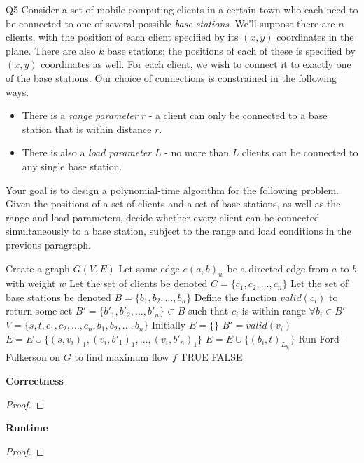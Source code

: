 \begin{problem}
  {Q5}
  Consider a set of mobile computing clients in a certain town who each need to be connected to one of several possible \textit{base stations}.
  We'll suppose there are $n$ clients, with the position of each client specified by its $(x,y)$ coordinates in the plane. There are also $k$ base stations; the positions
  of each of these is specified by $(x,y)$ coordinates as well. For each client, we wish to connect it to exactly one of the base stations. Our
  choice of connections is constrained in the following ways.\\
  \begin{itemize}
  \item There is a \textit{range parameter} $r$ - a client can only be connected to a base station that is within distance $r$.
  \item There is also a \textit{load parameter} $L$ - no more than $L$ clients can be connected to any single base station.
  \end{itemize}
  Your goal is to design a polynomial-time algorithm for the following problem. Given the positions of a set of clients and a set of base stations, as well as the range and load parameters, decide
  whether every client can be connected simultaneously to a base station, subject to the range and load conditions in the previous paragraph.
  \begin{algorithmic}[1]
    \STATE Create a graph $G(V, E)$
    \STATE Let some edge $e(a, b)_w$ be a directed edge from $a$ to $b$ with weight $w$
    \STATE Let the set of clients be denoted $C = \{c_1, c_2, \dots, c_n\}$
    \STATE Let the set of base stations be denoted $B = \{b_1, b_2, \dots, b_n\}$
    \STATE Define the function $valid(c_i)$ to return some set $B' = \{b'_1, b'_2, \dots, b'_n\} \subset B$ such that $c_i$ is within range $\forall b_i \in B'$
    \STATE $V = \{s, t, c_1, c_2, \dots, c_n, b_1, b_2, \dots, b_n\}$
    \STATE Initially $E = \{\}$
    \STATE $B' = valid(v_i)$
    \STATE $E = E \cup \{(s, v_i)_1, (v_i, b'_1)_1, \dots, (v_i, b'_n)_1\}$
    \ENDIF
    \STATE $E = E \cup \{(b_i, t)_{L_{b_i}}\}$
    \ENDIF
    \ENDFOR
    \STATE Run Ford-Fulkerson on $G$ to find maximum flow $f$
    \RETURN TRUE
    \ELSE
    \RETURN FALSE
    \ENDIF
  \end{algorithmic}
  \noindent
  \textbf{Correctness}
  \begin{proof}
  \end{proof}
  \noindent
  \textbf{Runtime}
  \begin{proof}
  \end{proof}
\end{problem}
